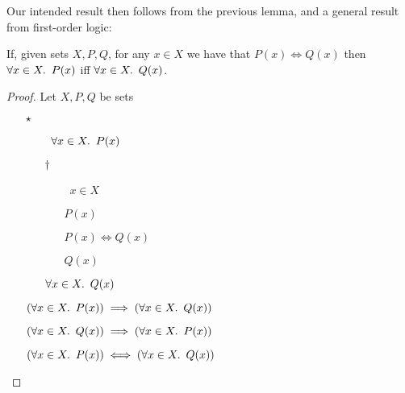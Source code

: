 Our intended result then follows from the previous lemma, and a general result from first-order logic:

\begin{lemma}\label{lemma:epic-preserve-2}
  If, given sets $X, P, Q$, for any $x\in X$ we have that ${P(x) \iff Q(x)}$ then $\forall x\in X\ldotp~P(x)$ iff $\forall x\in X\ldotp~Q(x)$.

  \begin{proof}
    Let $X, P, Q$ be sets
    \begin{itemize}
      \item[$\star$]
        \begin{itemize}
          \item[\phs]
            \Ass~$\forall x\in X\ldotp~P(x)$
            \marginnote{\Hyp}

          \item[$\dagger$]
            \begin{itemize}
              \item[\phs]
                \Let~$x\in X$
                \marginnote{\Hyp}

              \item[\phs]
                $P(x)$
                \marginnote{$\forall$-\Elim-$\star$}

              \item[\phs]
                $P(x)\iff Q(x)$

              \item[\imps]
                $Q(x)$
                \marginnote{\iffs-\Elim}
            \end{itemize}

            \item[\imps]
              $\forall x\in X\ldotp~Q(x)$
              \marginnote{$\forall$-\Intro-$\dagger$}
        \end{itemize}

      \item[\imps]
        $(\forall x\in X\ldotp~P(x))\implies(\forall x\in X\ldotp~Q(x))$
        \marginnote{\imps-\Intro-$\star$}
      \item[\phantom{\imps}]
        $(\forall x\in X\ldotp~Q(x))\implies(\forall x\in X\ldotp~P(x))$
      \item[\iffs]
        $(\forall x\in X\ldotp~P(x))\iff(\forall x\in X\ldotp~Q(x))$
        \qedhere
        \marginnote{\iffs-\Intro}
    \end{itemize}
  \end{proof}
\end{lemma}

